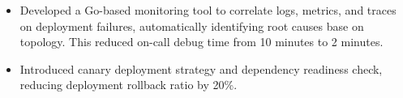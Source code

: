 \documentclass[11pt, letterpaper]{simple-cv}
\begin{document}
\begin{itemize}
	\item Developed a Go-based monitoring tool to correlate logs, metrics, and traces on deployment failures, automatically identifying root causes base on topology. This reduced on-call debug time from 10 minutes to 2 minutes.
	\item Introduced canary deployment strategy and dependency readiness check, reducing deployment rollback ratio by 20\%.
\end{itemize}


\end{document}
